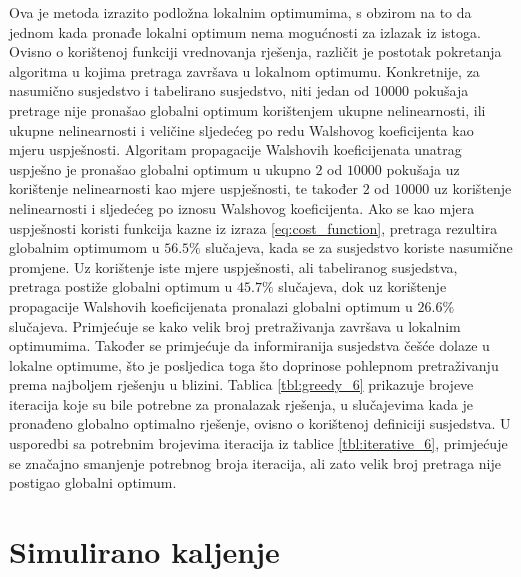 Ova je metoda izrazito podložna lokalnim optimumima, s obzirom na to da jednom kada pronađe lokalni optimum nema mogućnosti za izlazak iz istoga.
Ovisno o korištenoj funkciji vrednovanja rješenja, različit je postotak pokretanja algoritma u kojima pretraga završava u lokalnom optimumu.
Konkretnije, za nasumično susjedstvo i tabelirano susjedstvo, niti jedan od $10 000$ pokušaja pretrage nije pronašao globalni optimum korištenjem ukupne nelinearnosti, ili ukupne nelinearnosti i veličine sljedećeg po redu Walshovog koeficijenta kao mjeru uspješnosti.
Algoritam propagacije Walshovih koeficijenata unatrag uspješno je pronašao globalni optimum u ukupno $2$ od $10 000$ pokušaja uz korištenje nelinearnosti kao mjere uspješnosti, te također $2$ od $10 000$ uz korištenje nelinearnosti i sljedećeg po iznosu Walshovog koeficijenta.
Ako se kao mjera uspješnosti koristi funkcija kazne iz izraza \eqref{eq:cost_function}, pretraga rezultira globalnim optimumom u $56.5\%$ slučajeva, kada se za susjedstvo koriste nasumične promjene.
Uz korištenje iste mjere uspješnosti, ali tabeliranog susjedstva, pretraga postiže globalni optimum u $45.7\%$ slučajeva, dok uz korištenje propagacije Walshovih koeficijenata pronalazi globalni optimum u $26.6\%$ slučajeva.
Primjećuje se kako velik broj pretraživanja završava u lokalnim optimumima.
Također se primjećuje da informiranija susjedstva češće dolaze u lokalne optimume, što je posljedica toga što doprinose pohlepnom pretraživanju prema najboljem rješenju u blizini.
Tablica \ref{tbl:greedy_6} prikazuje brojeve iteracija koje su bile potrebne za pronalazak rješenja, u slučajevima kada je pronađeno globalno optimalno rješenje, ovisno o korištenoj definiciji susjedstva.
U usporedbi sa potrebnim brojevima iteracija iz tablice \ref{tbl:iterative_6}, primjećuje se značajno smanjenje potrebnog broja iteracija, ali zato velik broj pretraga nije postigao globalni optimum.

\section{Simulirano kaljenje}

